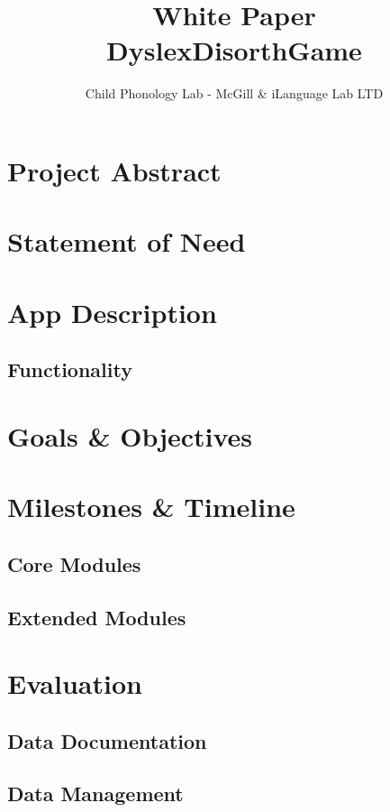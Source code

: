 \documentclass[12 pt]{article}
\title{White Paper \\ DyslexDisorthGame}
\author{Child Phonology Lab - McGill \& iLanguage Lab LTD}
\date{}
\begin{document}
\maketitle{} 

\tableofcontents

\section {Project Abstract}

\section {Statement of Need}

\section {App Description}

\subsection{Functionality}

\section {Goals \& Objectives}

\section {Milestones \& Timeline}

\subsection{Core Modules}

\subsection{Extended Modules}

\section {Evaluation}

\subsection {Data Documentation }

\subsection {Data Management }

\appendix
\end{document}
